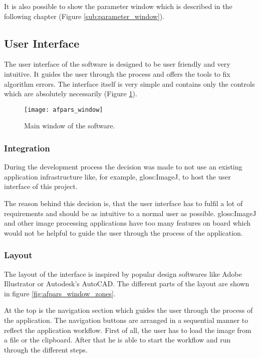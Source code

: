 It is also possible to show the parameter window which is described in the following chapter (Figure \ref{sub:parameter_window}).

\pagebreak
\subsection{User Interface}

The user interface of the software is designed to be user friendly and very intuitive. It guides the user through the process and offers the tools to fix algorithm errors. The interface itself is very simple and contains only the controls which are absolutely necessarily (Figure \ref{fig:afpars_window}).

\begin{figure}[h!]
  \centering
      \texttt{[image: afpars\_window]}
  \caption{Main window of the software.}
  \label{fig:afpars_window}
\end{figure}

\subsubsection{Integration}
During the development process the decision was made to not use an existing application infrastructure like, for example, \gls{gloss:ImageJ}, to host the user interface of this project.

The reason behind this decision is, that the user interface has to fulfil a lot of requirements and should be as intuitive to a normal user as possible. \gls{gloss:ImageJ} and other image processing applications have too many features on board which would not be helpful to guide the user through the process of the application.

\subsubsection{Layout}

The layout of the interface is inspired by popular design softwares like Adobe Illustrator or Autodesk's AutoCAD. The different parts of the layout are shown in figure \ref{fig:afpars_window_zones}.

At the top is the navigation section which guides the user through the process of the application. The navigation buttons are arranged in a sequential manner to reflect the application workflow. First of all, the user has to load the image from a file or the clipboard. After that he is able to start the workflow and run through the different steps.

